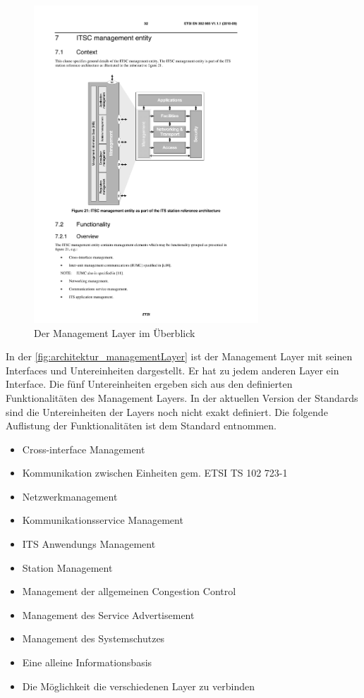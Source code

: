 \begin{figure}
	\includegraphics[width=0.75\textwidth]{content/images/02_architektur/managementLayer.pdf}
	\caption{Der Management Layer im Überblick \cite{etsi2010302}}
	\label{fig:architektur_managementLayer}
\end{figure}

In der  \autoref{fig:architektur_managementLayer} ist der Management Layer mit seinen Interfaces und Untereinheiten dargestellt. Er hat zu jedem anderen Layer ein Interface. Die fünf Untereinheiten ergeben sich aus den definierten Funktionalitäten des Management Layers. In der aktuellen Version der Standards sind die Untereinheiten der Layers noch nicht exakt definiert. Die folgende Auflistung der Funktionalitäten ist dem Standard \cite{etsi2010302} entnommen.

\begin{itemize}
	\item Cross-interface Management
	\item Kommunikation zwischen Einheiten gem. ETSI TS 102 723-1
	\item Netzwerkmanagement
	\item Kommunikationsservice Management
	\item \ac{ITS} Anwendungs Management
	\item Station Management
	\item Management der allgemeinen Congestion Control
	\item Management des Service Advertisement
	\item Management des Systemschutzes 
	\item Eine alleine Informationsbasis
	\item Die Möglichkeit die verschiedenen Layer zu verbinden
\end{itemize}

